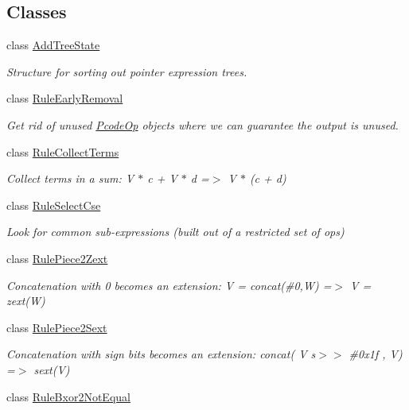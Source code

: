 \subsection*{Classes}
\begin{DoxyCompactItemize}
\item 
class \mbox{\hyperlink{class_add_tree_state}{Add\+Tree\+State}}
\begin{DoxyCompactList}\small\item\em Structure for sorting out pointer expression trees. \end{DoxyCompactList}\item 
class \mbox{\hyperlink{class_rule_early_removal}{Rule\+Early\+Removal}}
\begin{DoxyCompactList}\small\item\em Get rid of unused \mbox{\hyperlink{class_pcode_op}{Pcode\+Op}} objects where we can guarantee the output is unused. \end{DoxyCompactList}\item 
class \mbox{\hyperlink{class_rule_collect_terms}{Rule\+Collect\+Terms}}
\begin{DoxyCompactList}\small\item\em Collect terms in a sum\+: {\ttfamily V $\ast$ c + V $\ast$ d =$>$ V $\ast$ (c + d)} \end{DoxyCompactList}\item 
class \mbox{\hyperlink{class_rule_select_cse}{Rule\+Select\+Cse}}
\begin{DoxyCompactList}\small\item\em Look for common sub-\/expressions (built out of a restricted set of ops) \end{DoxyCompactList}\item 
class \mbox{\hyperlink{class_rule_piece2_zext}{Rule\+Piece2\+Zext}}
\begin{DoxyCompactList}\small\item\em Concatenation with 0 becomes an extension\+: {\ttfamily V = concat(\#0,W) =$>$ V = zext(\+W)} \end{DoxyCompactList}\item 
class \mbox{\hyperlink{class_rule_piece2_sext}{Rule\+Piece2\+Sext}}
\begin{DoxyCompactList}\small\item\em Concatenation with sign bits becomes an extension\+: {\ttfamily concat( V s$>$$>$ \#0x1f , V) =$>$ sext(\+V)} \end{DoxyCompactList}\item 
class \mbox{\hyperlink{class_rule_bxor2_not_equal}{Rule\+Bxor2\+Not\+Equal}}

\end{DoxyCompactItemize}
